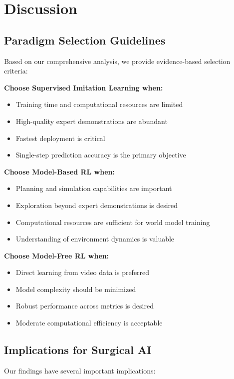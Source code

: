 \documentclass[conference]{IEEEtran}
\begin{document}
\section{Discussion}

\subsection{Paradigm Selection Guidelines}

Based on our comprehensive analysis, we provide evidence-based selection criteria:

\textbf{Choose Supervised Imitation Learning when:}
\begin{itemize}
\item Training time and computational resources are limited
\item High-quality expert demonstrations are abundant  
\item Fastest deployment is critical
\item Single-step prediction accuracy is the primary objective
\end{itemize}

\textbf{Choose Model-Based RL when:}
\begin{itemize}
\item Planning and simulation capabilities are important
\item Exploration beyond expert demonstrations is desired
\item Computational resources are sufficient for world model training
\item Understanding of environment dynamics is valuable
\end{itemize}

\textbf{Choose Model-Free RL when:}
\begin{itemize}
\item Direct learning from video data is preferred
\item Model complexity should be minimized
\item Robust performance across metrics is desired
\item Moderate computational efficiency is acceptable
\end{itemize}

\subsection{Implications for Surgical AI}

Our findings have several important implications:
\end{document}
